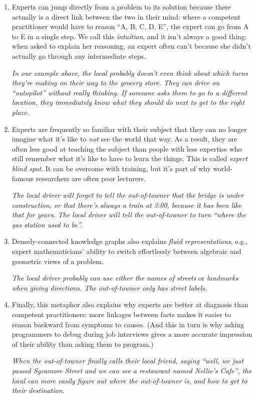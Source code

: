 \begin{enumerate}
\def\labelenumi{\arabic{enumi}.}
\item
  Experts can jump directly from a problem to its solution because there
  actually is a direct link between the two in their mind: where a
  competent practitioner would have to reason ``A, B, C, D, E'', the
  expert can go from A to E in a single step. We call this
  \emph{intuition}, and it isn't always a good thing: when asked to
  explain her reasoning, an expert often can't because she didn't
  actually go through any intermediate steps.

  \emph{In our example above, the local probably doesn't even think
  about which turns they're making on their way to the grocery store.
  They can drive on ``autopilot'' without really thinking. If someone
  asks them to go to a different location, they immediately know what
  they should do next to get to the right place.}
\item
  Experts are frequently so familiar with their subject that they can no
  longer imagine what it's like to \emph{not} see the world that way. As
  a result, they are often less good at teaching the subject than people
  with less expertise who still remember what it's like to have to learn
  the things. This is called \emph{expert blind spot}. It can be
  overcome with training, but it's part of why world-famous researchers
  are often poor lecturers.

  \emph{The local driver will forget to tell the out-of-towner that the
  bridge is under construction, or that there's always a train at 3:00,
  because it has been like that for years. The local driver will tell
  the out-of-towner to turn ``where the gas station used to be''.}
\item
  Densely-connected knowledge graphs also explains \emph{fluid
  representations}, e.g., expert mathematicians' ability to switch
  effortlessly between algebraic and geometric views of a problem.

  \emph{The local driver probably can use either the names of streets}
  or \emph{landmarks when giving directions. The out-of-towner only has
  street labels.}
\item
  Finally, this metaphor also explains why experts are better at
  diagnosis than competent practitioners: more linkages between facts
  makes it easier to reason backward from symptoms to causes. (And this
  in turn is why asking programmers to debug during job interviews gives
  a more accurate impression of their ability than asking them to
  program.)

  \emph{When the out-of-towner finally calls their local friend, saying
  ``well, we just passed Sycamore Street and we can see a restaurant
  named Nellie's Cafe'', the local can more easily figure out where the
  out-of-towner is, and how to get to their destination.}
\end{enumerate}

